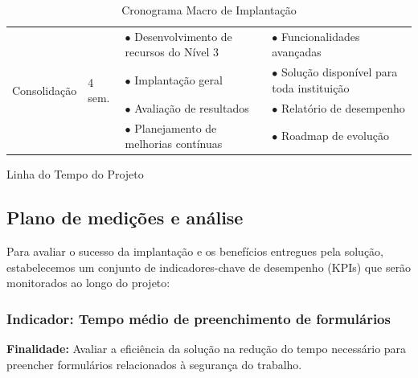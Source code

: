 \documentclass[12pt,a4paper]{article}
\begin{document}
\begin{landscape}
\begin{table}[htbp]
\begin{tabular}{|p{2cm}|p{1.2cm}|p{7cm}|p{6cm}|}
\hline
\multirow{4}{*}{Consolidação} & \multirow{4}{*}{4 sem.} & $\bullet$ Desenvolvimento de recursos do Nível 3 & $\bullet$ Funcionalidades avançadas \\
\cline{3-4}
 & & $\bullet$ Implantação geral & $\bullet$ Solução disponível para toda instituição \\
\cline{3-4}
 & & $\bullet$ Avaliação de resultados & $\bullet$ Relatório de desempenho \\
\cline{3-4}
 & & $\bullet$ Planejamento de melhorias contínuas & $\bullet$ Roadmap de evolução \\
\hline
\end{tabular}
\caption{Cronograma Macro de Implantação}
\end{table}
\end{landscape}

\begin{table}[htbp]
\centering
{}
\caption{Linha do Tempo do Projeto}
\end{table}

\clearpage
\subsection{Plano de medições e análise}

Para avaliar o sucesso da implantação e os benefícios entregues pela solução, estabelecemos um conjunto de indicadores-chave de desempenho (KPIs) que serão monitorados ao longo do projeto:

\subsubsection{Indicador: Tempo médio de preenchimento de formulários}

\textbf{Finalidade:} Avaliar a eficiência da solução na redução do tempo necessário para preencher formulários relacionados à segurança do trabalho.
\end{document}
